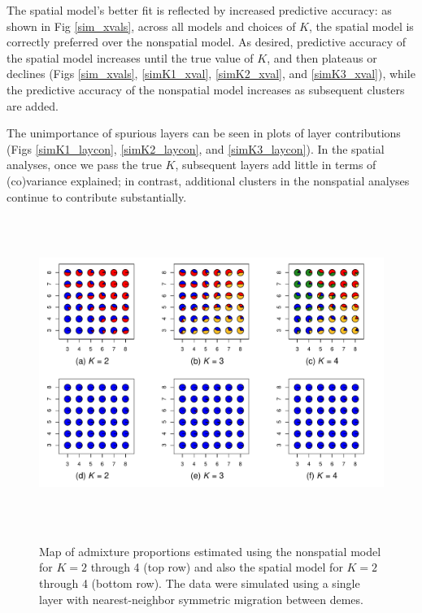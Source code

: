 \documentclass[12pt]{article}
\begin{document}
The spatial model's better fit is reflected by increased predictive accuracy:
as shown in Fig \ref{sim_xvals},
across all models and choices of $K$, the spatial model is correctly preferred over the nonspatial model.
As desired, predictive accuracy of the spatial model increases until the true value of $K$,
and then plateaus or declines
(Figs \ref{sim_xvals}, \ref{simK1_xval}, \ref{simK2_xval}, and \ref{simK3_xval}),
while the predictive accuracy of the nonspatial model increases as subsequent clusters are added.


The unimportance of spurious layers can be seen in plots of layer contributions
(Figs \ref{simK1_laycon}, \ref{simK2_laycon}, and \ref{simK3_laycon}).
In the spatial analyses, once we pass the true $K$, 
subsequent layers add little in terms of (co)variance explained; 
in contrast, additional clusters in the nonspatial analyses continue to contribute substantially.

\begin{figure}
	\centering
		{\includegraphics[width=6in,height=4in]{figs/sims/Fig2_simK1_sp_vs_nsp.pdf}}
	\caption{
	Map of admixture proportions estimated using the nonspatial model for $K=2$ through 4 (top row)
	and also the spatial model for $K=2$ through 4 (bottom row).
	The data were simulated using a single layer with nearest-neighbor symmetric migration between demes.
    }\label{simK1_pies}
\end{figure}
\end{document}
